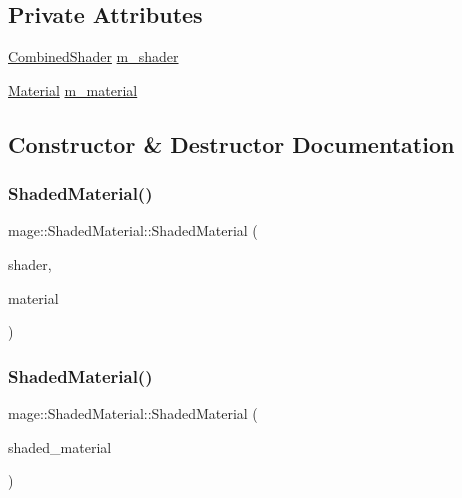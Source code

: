 \subsection*{Private Attributes}
\begin{DoxyCompactItemize}
\item 
\hyperlink{structmage_1_1_combined_shader}{Combined\+Shader} \hyperlink{structmage_1_1_shaded_material_a712d07ac1995ff592bbb8ab20a294270}{m\+\_\+shader}
\item 
\hyperlink{structmage_1_1_material}{Material} \hyperlink{structmage_1_1_shaded_material_a319e1ca2103c50f84ce0605b08bd34b4}{m\+\_\+material}
\end{DoxyCompactItemize}


\subsection{Constructor \& Destructor Documentation}
\hypertarget{structmage_1_1_shaded_material_a58594c0008865c68efc6ff6868016236}{}\label{structmage_1_1_shaded_material_a58594c0008865c68efc6ff6868016236} 
\subsubsection{\texorpdfstring{Shaded\+Material()}{ShadedMaterial()}\hspace{0.1cm}{\footnotesize\ttfamily [1/2]}}
{\footnotesize\ttfamily mage\+::\+Shaded\+Material\+::\+Shaded\+Material (\begin{DoxyParamCaption}\item[{const \hyperlink{structmage_1_1_combined_shader}{Combined\+Shader} \&}]{shader,  }\item[{const \hyperlink{structmage_1_1_material}{Material} \&}]{material }\end{DoxyParamCaption})}

\hypertarget{structmage_1_1_shaded_material_a8bd45b489933e89f0a16f79e29161c27}{}\label{structmage_1_1_shaded_material_a8bd45b489933e89f0a16f79e29161c27} 
\subsubsection{\texorpdfstring{Shaded\+Material()}{ShadedMaterial()}\hspace{0.1cm}{\footnotesize\ttfamily [2/2]}}
{\footnotesize\ttfamily mage\+::\+Shaded\+Material\+::\+Shaded\+Material (\begin{DoxyParamCaption}\item[{const \hyperlink{structmage_1_1_shaded_material}{Shaded\+Material} \&}]{shaded\+\_\+material }\end{DoxyParamCaption})\hspace{0.3cm}{\ttfamily [default]}}

